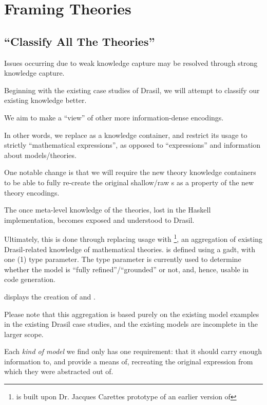\chapter{Framing Theories}
\label{chap:modelkinds}

\section{\textquotedblleft{}Classify All The Theories\textquotedblright{}}

Issues occurring due to weak knowledge capture may be resolved through strong
knowledge capture.

Beginning with the existing case studies of Drasil, we will attempt to classify
our existing knowledge better.

We aim to make \RelationConcept{} a ``view'' of other more information-dense
encodings.

In other words, we replace \Expr{} as a knowledge container, and restrict its
usage to strictly ``mathematical expressions'', as opposed to ``expressions''
and information about models/theories.

One notable change is that we will require the new theory knowledge containers
to be able to fully re-create the original shallow/raw \Expr{}s as a property of
the new theory encodings.

The once meta-level knowledge of the theories, lost in the Haskell
implementation, becomes exposed and understood to Drasil.

Ultimately, this is done through replacing \RelationConcept{} usage with
\ModelKind{}\footnote{\ModelKind{} is built upon Dr. Jacques Carettes prototype
of an earlier version of \ModelKinds{}}, an aggregation of existing
Drasil-related knowledge of mathematical theories. \ModelKind{} is defined using
a \acs{gadt}, with one (1) type parameter. The type parameter is currently used
to determine whether the model is ``fully refined''/``grounded'' or not, and,
hence, usable in code generation.

 displays the creation of \ModelKind{} and
\ModelKinds{}.

Please note that this aggregation is based purely on the existing model examples
in the existing Drasil case studies, and the existing models are incomplete in
the larger scope.

Each \textit{kind of model} we find only has one requirement: that it should
carry enough information to, and provide a means of, recreating the original
expression from which they were abstracted out of.

